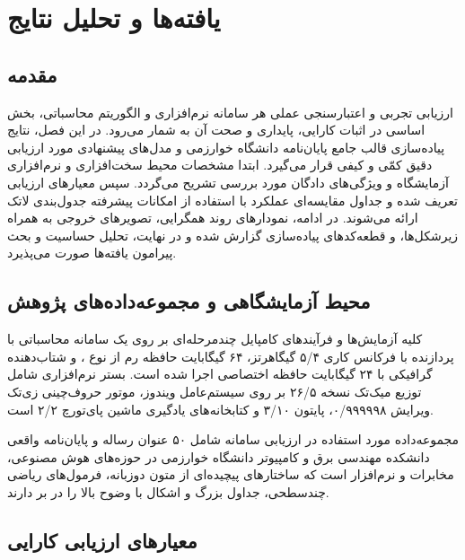 
\chapter{یافته‌ها و تحلیل نتایج}
\label{chap:results}

\section{مقدمه}
\label{sec:ch4_intro}

ارزیابی تجربی و اعتبارسنجی عملی هر سامانه نرم‌افزاری و الگوریتم محاسباتی، بخش اساسی در اثبات کارایی، پایداری و صحت آن به شمار می‌رود. در این فصل، نتایج پیاده‌سازی قالب جامع پایان‌نامه دانشگاه خوارزمی و مدل‌های پیشنهادی مورد ارزیابی دقیق کمّی و کیفی قرار می‌گیرد. ابتدا مشخصات محیط سخت‌افزاری و نرم‌افزاری آزمایشگاه و ویژگی‌های دادگان مورد بررسی تشریح می‌گردد. سپس معیارهای ارزیابی تعریف شده و جداول مقایسه‌ای عملکرد با استفاده از امکانات پیشرفته جدول‌بندی لاتک ارائه می‌شوند. در ادامه، نمودارهای روند همگرایی، تصویرهای خروجی به همراه زیرشکل‌ها، و قطعه‌کدهای پیاده‌سازی گزارش شده و در نهایت، تحلیل حساسیت و بحث پیرامون یافته‌ها صورت می‌پذیرد.

\section{محیط آزمایشگاهی و مجموعه‌داده‌های پژوهش}
\label{sec:ch4_setup}

کلیه آزمایش‌ها و فرآیندهای کامپایل چندمرحله‌ای بر روی یک سامانه محاسباتی با پردازنده  با فرکانس کاری ۵/۴ گیگاهرتز، ۶۴ گیگابایت حافظه رم از نوع ، و شتاب‌دهنده گرافیکی  با ۲۴ گیگابایت حافظه اختصاصی اجرا شده است. بستر نرم‌افزاری شامل توزیع میک‌تک نسخه ۲۶/۵ بر روی سیستم‌عامل ویندوز، موتور حروف‌چینی زی‌تک ویرایش ۰/۹۹۹۹۹۸، پایتون ۳/۱۰ و کتابخانه‌های یادگیری ماشین پای‌تورچ ۲/۲ است.

مجموعه‌داده مورد استفاده در ارزیابی سامانه شامل ۵۰ عنوان رساله و پایان‌نامه واقعی دانشکده مهندسی برق و کامپیوتر دانشگاه خوارزمی در حوزه‌های هوش مصنوعی، مخابرات و نرم‌افزار است که ساختارهای پیچیده‌ای از متون دوزبانه، فرمول‌های ریاضی چندسطحی، جداول بزرگ و اشکال با وضوح بالا را در بر دارند.

\section{معیارهای ارزیابی کارایی}
\label{sec:ch4_metrics}

